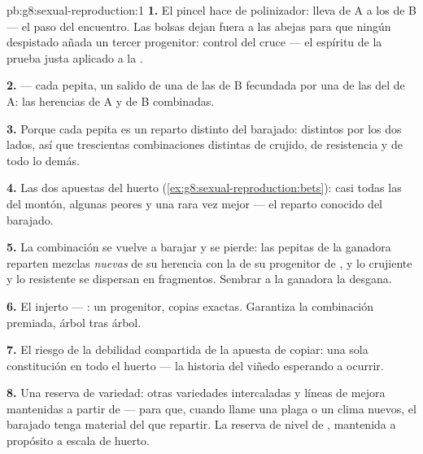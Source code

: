 \begin{solution}{pb:g8:sexual-reproduction:1}
\textbf{1.} El pincel hace de polinizador: lleva   de
A a los  de B --- el paso del encuentro. Las bolsas dejan fuera
a las abejas para que ningún  despistado añada un tercer
progenitor: control del cruce --- el espíritu de la prueba justa
aplicado a la .

\textbf{2.}  --- cada pepita, un  salido de una de las
  de B fecundada por una de las  del  de A:
las herencias de A y de B combinadas.

\textbf{3.} Porque cada pepita es un reparto distinto del barajado:
 distintos por los dos lados, así que trescientas combinaciones
distintas de crujido, de resistencia y de todo lo demás.

\textbf{4.} Las dos apuestas del huerto
(\cref{ex:g8:sexual-reproduction:bets}): casi todas las  del
montón, algunas peores y una rara vez mejor --- el reparto conocido del
barajado.

\textbf{5.} La combinación se vuelve a barajar y se pierde: las pepitas
de la ganadora reparten mezclas \emph{nuevas} de su herencia con la de
su progenitor de , y lo crujiente y lo resistente se dispersan en
fragmentos. Sembrar a la ganadora la desgana.

\textbf{6.} El injerto --- : un progenitor,
copias exactas. Garantiza la combinación premiada, árbol tras árbol.

\textbf{7.} El riesgo de la debilidad compartida de la apuesta de
copiar: una sola constitución en todo el huerto --- la historia del
viñedo esperando a ocurrir.

\textbf{8.} Una reserva de variedad: otras variedades intercaladas y
líneas de mejora mantenidas a partir de  --- para que, cuando
llame una plaga o un clima nuevos, el barajado tenga material del que
repartir. La reserva de nivel de , mantenida a propósito a
escala de huerto.


\end{solution}
